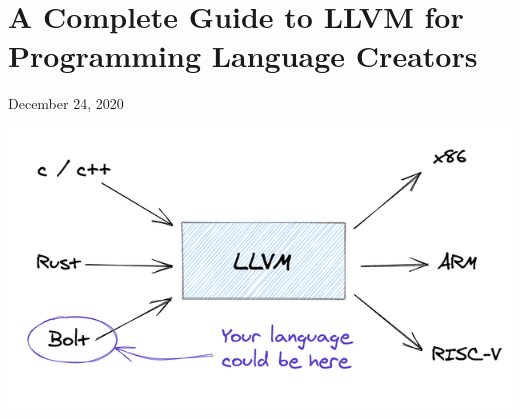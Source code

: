 %
%
%
%
%
%

\hypertarget{top-of-page}{%
\chapter{A Complete Guide to LLVM for Programming Language
Creators}\label{top-of-page}}

December 24, 2020
%
%

\includegraphics[width=\linewidth]{08_files/llvm.png}

